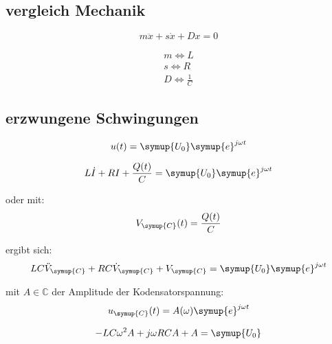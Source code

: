         \subsection{vergleich Mechanik}

        \begin{equation}
            m \ddot{x} + s \dot{x} + Dx = 0 \nonumber
        \end{equation}

        \begin{align}
            m \Leftrightarrow L  \nonumber\\
            s \Leftrightarrow R  \nonumber\\
            D \Leftrightarrow \frac{1}{C} \nonumber
        \end{align}

    \subsection{erzwungene Schwingungen}

    \begin{equation}
        u(t)= \symup{U_0} \symup{e}^{j \omega t} \nonumber
    \end{equation}

    \begin{equation}
        L \dot{I} + R I + \frac{Q(t)}{C} = \symup{U_0} \symup{e}^{j \omega t} \nonumber
    \end{equation}

    oder mit:
    \begin{equation}
        V_{\symup{C}} (t) = \frac{Q(t)}{C} \nonumber
    \end{equation}

    ergibt sich:
    \begin{equation}
        LC \ddot{V}_{\symup{C}} + RC \dot{V}_{\symup{C}} + V_{\symup{C}} = \symup{U_0} \symup{e}^{j \omega t} \nonumber
    \end{equation}

    mit $A \in  \mathds{C}$ der Amplitude der Kodensatorspannung:
    \begin{equation}
        u_{\symup{C}} (t) = A(\omega) \symup{e}^{j \omega t} \nonumber
    \end{equation}

    \begin{equation}
        -LC \omega^2 A + j\omega RC A +A = \symup{U_0} \nonumber
    \end{equation}

